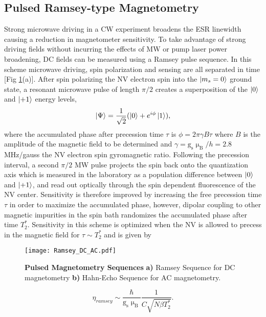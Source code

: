 
\subsection{Pulsed Ramsey-type Magnetometry} \label{Pulsed_Ramsey}

Strong microwave driving in a CW experiment broadens the ESR linewidth causing a reduction in magnetometer sensitivity. To take advantage of strong driving fields without incurring the effects of MW or pump laser power broadening, DC fields can be measured using a Ramsey pulse sequence. In this scheme microwave driving, spin polarization and sensing are all separated in time [Fig \ref{Fig_two}(a)]. After spin polarizing the NV electron spin into the $\ket{m_s = 0}$ ground state, a resonant microwave pulse of length $\pi/2$ creates a superposition of the $\ket{0}$ and $\ket{+1}$ energy levels,
\begin{equation}
\ket{\Psi} = \frac{1}{\sqrt{2}}(\ket{0} + e^{i\phi}\ket{1}),
\end{equation}
where the accumulated phase after precession time $\tau$ is $\phi = 2\pi \gamma B \tau$ where $B$ is the amplitude of the magnetic field to be determined and $\gamma = \text{g}_\text{s} \upmu_\text{B} / h = 2.8$ MHz/gauss the NV electron spin gyromagnetic ratio. Following the precession interval, a second $\pi/2$ MW pulse projects the spin back onto the quantization axis which is measured in the laboratory as a population difference between $\ket{0}$ and $\ket{+1}$, and read out optically through the spin dependent fluorescence of the NV center. Sensitivity is therefore improved by increasing the free precession time $\tau$ in order to maximize the accumulated phase, however, dipolar coupling to other magnetic impurities in the spin bath randomizes the accumulated phase after time $T_2^*$. Sensitivity in this scheme is optimized when the NV is allowed to precess in the magnetic field for $\tau \sim T_2^*$ and is given by 
\begin{figure}[t!]
\centering
\texttt{[image: Ramsey\_DC\_AC.pdf]}  
\caption{\textbf{Pulsed Magnetometry Sequences} \textbf{a)} Ramsey Sequence for DC magnetometry \textbf{b)} Hahn-Echo Sequence for AC magnetometry.}
\label{Fig_two}
\end{figure}
\begin{equation}
\eta_{ramsey} \sim \frac{\hbar}{\text{g}_\text{s} \upmu_{\text{B}}} \frac{1}{C\sqrt{N \beta T_2^*}}.
\end{equation}
